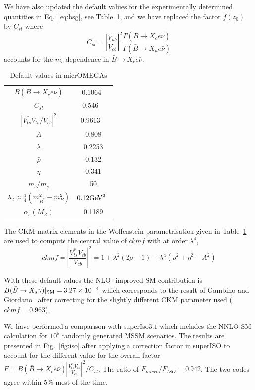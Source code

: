 \documentclass[12pt,a4paper]{article}
\begin{document}
We have also updated the default values for the experimentally determined quantities in
Eq.~\ref{eq:bsg}, see Table~\ref{tab:def}, and we have replaced the factor $f(z_0)$ by $C_{sl}$ where
\begin{equation}
C_{sl}=\left|\frac{V_{ub}}{V_{cb}}\right|^2 \frac{\Gamma(\bar{B}\rightarrow X_c e\bar\nu)}{\Gamma(\bar{B}\rightarrow X_u e\bar\nu)}
\end{equation}
accounts for the $m_c$ dependence in $\bar{B}\rightarrow X_c e\bar\nu$.


\begin{table}
\begin{center}
\begin{tabular}{|c|c|}
\hline
$B(\bar{B}\rightarrow X_c e\bar\nu)$ & 0.1064~\cite{Nakamura:2010zzi}\\
$C_{sl}$ & 0.546 ~\cite{Gambino:2008fj}\\
$|V_{ts}^*V_{tb}/V_{cb}|^2$ & 0.9613 ~\cite{Nakamura:2010zzi}\\
$A$& 0.808\\
$\lambda$ & 0.2253\\
$\bar{\rho}$ & 0.132\\
$\bar{\eta}$ &0.341 \\
$m_b/m_s$  & 50\\
$\lambda_2\approx \frac{1}{4} (m^2_{B^*}-m^2_B)$ &  $0.12 {\rm GeV}^2$~\cite{Yao:2006px}\\
$\alpha_s(M_Z)$ &0.1189 \\\hline
\end{tabular}
\caption{Default values in micrOMEGAs }
\end{center}
\label{tab:def}
\end{table}

The CKM matrix elements in the Wolfenstein parametrisation given in Table~\ref{tab:def}
are used to compute the central value of $ckmf$ with at order $\lambda^4$,
\begin{equation}
ckmf=\left|\frac{V_{ts}^*V_{tb}}{V_{cb}}\right|^2=1+\lambda^2 (2\bar{\rho}-1) +
\lambda^4 (\bar\rho^2+\bar\eta^2-A^2)
\end{equation}




With these default values  the NLO- improved SM contribution 
is $B(\bar{B}\rightarrow X_s \gamma)|_{\rm SM}=3.27\times 10^{-4}$ which corresponds to the result of Gambino
and Giordano~\cite{Gambino:2008fj} after correcting for the slightly different CKM parameter used ($ckmf=0.963$).

We have performed a comparison with superIso$3.1$ which includes the NNLO SM calculation for 
$10^5$ randomly generated MSSM scenarios. The results are presented in Fig.~\ref{fig:iso}  after applying a
correction factor in superISO to account for the different value for the overall factor
$F=B(\bar{B}\rightarrow X_c e\bar\nu) \left|\frac{V_{ts}^* V_{tb}}
{V_{cb}}\right|^2/C_{sl}$. The ratio of $F_{micro}/F_{ISO}=0.942$.
The two codes agree within 5\% most of the time. 
\end{document}
